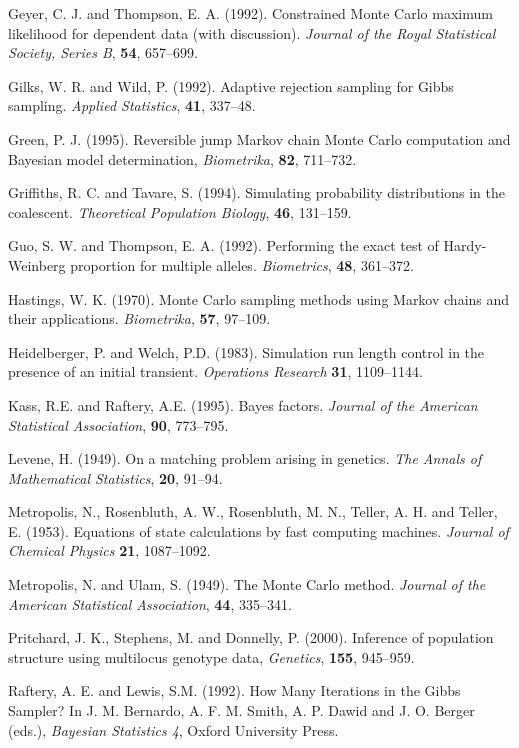 Geyer, C. J. and Thompson, E. A. (1992). Constrained Monte Carlo maximum likelihood for dependent data (with discussion). {\em Journal of the Royal Statistical Society, Series B}, {\bf 54}, 657--699.

Gilks, W. R. and Wild, P. (1992). Adaptive rejection sampling for Gibbs
sampling. {\em Applied Statistics}, {\bf 41}, 337--48.

Green, P. J. (1995). Reversible jump Markov chain Monte Carlo computation and Bayesian model   determination,  {\em Biometrika}, {\bf 82}, 711--732.

Griffiths, R. C. and Tavare, S. (1994). Simulating probability distributions in the coalescent. {\em Theoretical Population Biology}, {\bf 46}, 131--159.

Guo, S. W. and Thompson, E. A. (1992).  Performing the exact test of Hardy-Weinberg proportion for multiple alleles. {\em Biometrics}, {\bf 48}, 361--372.

Hastings, W. K. (1970). Monte Carlo sampling methods using Markov chains and their applications. {\em Biometrika}, {\bf 57}, 97--109.

Heidelberger, P. and Welch, P.D. (1983).  Simulation run length control in
the presence of an initial transient. {\em Operations Research} {\bf 31},
1109--1144.

Kass, R.E. and Raftery, A.E.  (1995). Bayes factors. {\em Journal of the
American Statistical Association}, {\bf 90}, 773--795.

Levene, H. (1949). On a matching problem arising in genetics. {\em The Annals of Mathematical Statistics}, {\bf 20}, 91--94.

Metropolis, N., Rosenbluth, A. W., Rosenbluth, M. N., Teller, A. H. and Teller, E. (1953). Equations of state calculations by fast computing machines. {\em Journal of Chemical Physics} {\bf 21}, 1087--1092.

Metropolis, N. and Ulam, S.  (1949).  The Monte Carlo method.  {\em Journal of the American Statistical Association}, {\bf 44}, 335--341.



Pritchard, J. K., Stephens, M. and Donnelly, P. (2000).
 Inference of population structure using multilocus genotype data,
 {\em Genetics},
  {\bf 155}, 945--959.






Raftery, A. E. and Lewis, S.M. (1992).  How Many Iterations in the Gibbs
Sampler?  In J. M. Bernardo, A. F. M. Smith, A. P. Dawid and J. O. Berger
(eds.), {\em Bayesian Statistics 4}, Oxford University Press.


